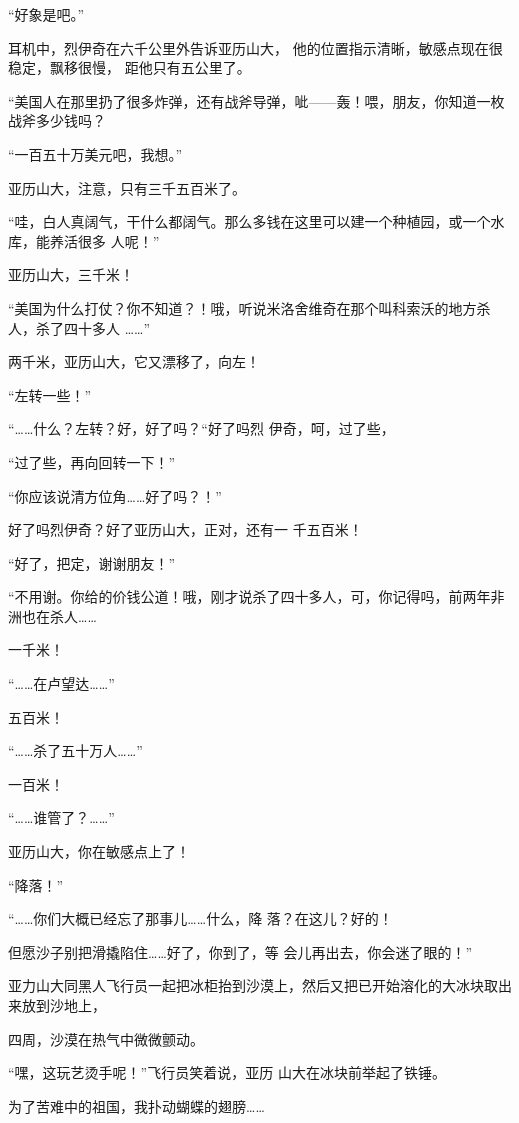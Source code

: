 \documentclass{article}
\begin{document}
“好象是吧。” 

耳机中，烈伊奇在六千公里外告诉亚历山大，
\newpage
他的位置指示清晰，敏感点现在很稳定，飘移很慢，
距他只有五公里了。 

“美国人在那里扔了很多炸弹，还有战斧导弹，呲——轰！喂，朋友，你知道一枚战斧多少钱吗？


“一百五十万美元吧，我想。” 


亚历山大，注意，只有三千五百米了。 

“哇，白人真阔气，干什么都阔气。那么多钱在这里可以建一个种植园，或一个水库，能养活很多
人呢！” 


亚历山大，三千米！ 

“美国为什么打仗？你不知道？！哦，听说米洛舍维奇在那个叫科索沃的地方杀人，杀了四十多人
……” 


\newpage

两千米，亚历山大，它又漂移了，向左！ 


“左转一些！” 

“……什么？左转？好，好了吗？“好了吗烈
伊奇，呵，过了些， 


“过了些，再向回转一下！” 


“你应该说清方位角……好了吗？！” 

好了吗烈伊奇？好了亚历山大，正对，还有一
千五百米！ 


“好了，把定，谢谢朋友！” 

“不用谢。你给的价钱公道！哦，刚才说杀了四十多人，可，你记得吗，前两年非洲也在杀人……


一千米！ 


\newpage

“……在卢望达……” 


五百米！ 


“……杀了五十万人……” 


一百米！ 


“……谁管了？……” 


亚历山大，你在敏感点上了！ 


“降落！” 

“……你们大概已经忘了那事儿……什么，降
落？在这儿？好的！ 

但愿沙子别把滑撬陷住……好了，你到了，等
会儿再出去，你会迷了眼的！” 

亚力山大同黑人飞行员一起把冰柜抬到沙漠上，然后又把已开始溶化的大冰块取出来放到沙地上，
\newpage

四周，沙漠在热气中微微颤动。 

“嘿，这玩艺烫手呢！”飞行员笑着说，亚历
山大在冰块前举起了铁锤。 


为了苦难中的祖国，我扑动蝴蝶的翅膀…… 
\end{document}
